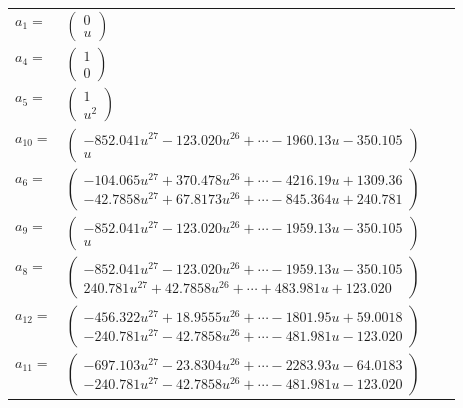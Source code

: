 \documentclass[1p]{elsarticle_modified}
\theoremstyle{definition}
\begin{document}
\begin{tabular}{m{7pt} m{180pt} m{7pt} m{180pt} }
\flushright $a_{1}=$&$\begin{pmatrix}0\\u\end{pmatrix}$ \\
\flushright $a_{4}=$&$\begin{pmatrix}1\\0\end{pmatrix}$ \\
\flushright $a_{5}=$&$\begin{pmatrix}1\\u^2\end{pmatrix}$ \\
\flushright $a_{10}=$&$\begin{pmatrix}-852.041 u^{27}-123.020 u^{26}+\cdots-1960.13 u-350.105\\u\end{pmatrix}$ \\
\flushright $a_{6}=$&$\begin{pmatrix}-104.065 u^{27}+370.478 u^{26}+\cdots-4216.19 u+1309.36\\-42.7858 u^{27}+67.8173 u^{26}+\cdots-845.364 u+240.781\end{pmatrix}$ \\
\flushright $a_{9}=$&$\begin{pmatrix}-852.041 u^{27}-123.020 u^{26}+\cdots-1959.13 u-350.105\\u\end{pmatrix}$ \\
\flushright $a_{8}=$&$\begin{pmatrix}-852.041 u^{27}-123.020 u^{26}+\cdots-1959.13 u-350.105\\240.781 u^{27}+42.7858 u^{26}+\cdots+483.981 u+123.020\end{pmatrix}$ \\
\flushright $a_{12}=$&$\begin{pmatrix}-456.322 u^{27}+18.9555 u^{26}+\cdots-1801.95 u+59.0018\\-240.781 u^{27}-42.7858 u^{26}+\cdots-481.981 u-123.020\end{pmatrix}$ \\
\flushright $a_{11}=$&$\begin{pmatrix}-697.103 u^{27}-23.8304 u^{26}+\cdots-2283.93 u-64.0183\\-240.781 u^{27}-42.7858 u^{26}+\cdots-481.981 u-123.020\end{pmatrix}$ \\

\end{tabular}
\end{document}
